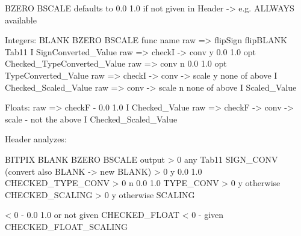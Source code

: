 

BZERO BSCALE defaults to 0.0 1.0 if not given in Header -> e.g. ALLWAYS available
				
Integers:			BLANK	BZERO BSCALE		func name
raw => flipSign		     flipBLANK	Tab11			I SignConverted_Value
raw => checkI -> conv		  y	0.0 1.0  		opt Checked_TypeConverted_Value
raw => conv		  	  n	0.0 1.0  		opt TypeConverted_Value
raw => checkI -> conv -> scale	  y 	none of above		I Checked_Scaled_Value
raw => conv -> scale		  n	none of above		I Scaled_Value


Floats:
raw => checkF			  -	0.0 1.0			I Checked_Value
raw => checkF -> conv -> scale	  -	not the above		I Checked_Scaled_Value



Header analyzes:

BITPIX		BLANK	BZERO BSCALE		output
 > 0		 any	Tab11			SIGN_CONV (convert also BLANK -> new BLANK)
 > 0		  y	0.0 1.0			CHECKED_TYPE_CONV
 > 0		  n	0.0 1.0 		TYPE_CONV
 > 0		  y	otherwise		CHECKED_SCALING
 > 0		  y	otherwise		SCALING

 < 0		  -	0.0 1.0 or not given	CHECKED_FLOAT	
 < 0		  -	given			CHECKED_FLOAT_SCALING	

